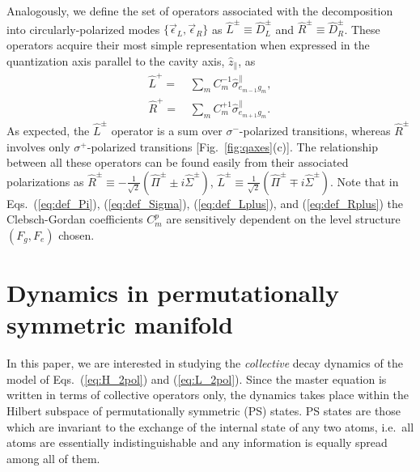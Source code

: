 \documentclass[aps,prx,superscriptaddress,twocolumn,notitlepage,nofootinbib,longbibliography]{revtex4-2}
\newcommand{\quv}{\hat{z}}
\begin{document}
Analogously, we define the set of operators associated with the decomposition into circularly-polarized modes $\{\vec{\epsilon}_L,\vec{\epsilon}_R\}$ as $\hat{L}^\pm \equiv \hat{D}^\pm_L$ and $\hat{R}^\pm \equiv \hat{D}^\pm_R$.
These operators acquire their most simple representation when expressed in the quantization axis parallel to the cavity axis, $\quv_\parallel$, as
\begin{align}
	\hat{L}^+ =&\, \sum_m C^{-1}_m \hat{\sigma}^\parallel_{e_{m-1}g_m},
\label{eq:def_Lplus}\\
	\hat{R}^+ =&\, \sum_m C^{+1}_m \hat{\sigma}^\parallel_{e_{m+1}g_m}.
\label{eq:def_Rplus}
\end{align}
As expected, the $\hat{L}^\pm$ operator is a sum over $\sigma^-$-polarized transitions, whereas $\hat{R}^\pm$ involves only $\sigma^+$-polarized transitions [Fig.~\ref{fig:qaxes}(c)]. The relationship between all these operators can be found easily from their associated polarizations as $\hat{R}^\pm \equiv -\frac{1}{\sqrt{2}} \left( \hat{\Pi}^\pm \pm i \hat{\Sigma}^\pm \right)$, $\hat{L}^\pm \equiv \frac{1}{\sqrt{2}} \left( \hat{\Pi}^\pm \mp i \hat{\Sigma}^\pm \right)$.
Note that in Eqs.~(\ref{eq:def_Pi}), (\ref{eq:def_Sigma}), (\ref{eq:def_Lplus}), and (\ref{eq:def_Rplus}) the Clebsch-Gordan coefficients $C^p_m$ are sensitively dependent on the level structure $(F_g,F_e)$ chosen.






\section{Dynamics in permutationally symmetric manifold\label{sec:collective_dyn}}

In this paper, we are interested in studying the \emph{collective} decay dynamics of the model of Eqs.~(\ref{eq:H_2pol}) and (\ref{eq:L_2pol}).
Since the master equation is written in terms of collective operators only, the dynamics takes place within the Hilbert subspace of permutationally symmetric (PS) states. PS states are those which are invariant to the exchange of the internal state of any two atoms, i.e.~all atoms are essentially indistinguishable and any information is equally spread among all of them.
\end{document}
